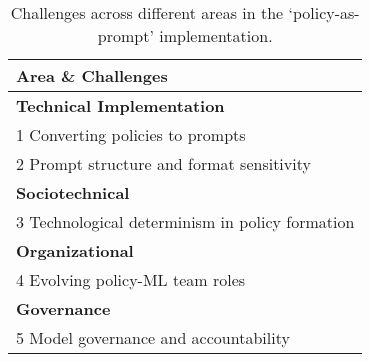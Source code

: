 \begin{table}[htb!]
    \centering
    \caption{Challenges across different areas in the `policy-as-prompt' implementation. }
    \label{tab:area_challenges}
    \begin{tabular}{l}
        \toprule
        \textbf{Area \& Challenges} \\
        \midrule
        \textbf{Technical Implementation}   \\
        {1} Converting policies to prompts \\
        {2} Prompt structure and format sensitivity \\
        \midrule
        \textbf{Sociotechnical}    \\
        {3} Technological determinism in policy formation  \\
        \midrule
        \textbf{Organizational}   \\
        {4} Evolving policy-ML team roles \\
        \midrule
        \textbf{Governance} \\
        {5} Model governance and accountability    \\
        \bottomrule
\end{tabular}
\end{table}


